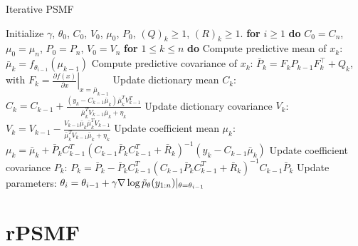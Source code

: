 \documentclass{mldsmsc}
\begin{document}
\begin{algorithm}[H]
\caption{Iterative PSMF}
\begin{algorithmic}[1]
\State Initialize $\gamma$, $\theta_0$, $C_0$, $V_0$, $\mu_0$, $P_0$, $(Q)_k{\geq1}$, $(R)_k{\geq1}$.
\State \textbf{for} $i \geq 1$ \textbf{do}
\State \hspace{1em} $C_0 = C_n$, $\mu_0 = \mu_n$, $P_0 = P_n$, $V_0 = V_n$
\State \hspace{1em} \textbf{for} $1 \leq k \leq n$ \textbf{do}
\State \hspace{2em} Compute predictive mean of $x_k$:
\State \hspace{3em} $\bar{\mu}_k = f_{\theta_{i-1}}(\mu_{k-1})$
\State \hspace{2em} Compute predictive covariance of $x_k$:
\State \hspace{3em} $\bar{P}_k = F_k P_{k-1} F_k^\top + Q_k$, with $F_k = \left. \frac{\partial f(x)}{\partial x} \right|_{x=\bar{\mu}_{k-1}}$
\State \hspace{2em} Update dictionary mean $C_k$:
\State \hspace{3em} $C_k = C_{k-1} + \frac{(y_k - C_{k-1} \bar{\mu}_k) \bar{\mu}_k^T V_{k-1}^T}{\bar{\mu}_k^T V_{k-1} \bar{\mu}_k + \eta_k}$
\State \hspace{2em} Update dictionary covariance $V_k$:
\State \hspace{3em} $V_k = V_{k-1} - \frac{V_{k-1} \bar{\mu}_k \bar{\mu}_k^T V_{k-1}}{\bar{\mu}_k^T V_{k-1} \bar{\mu}_k + \eta_k}$
\State \hspace{2em} Update coefficient mean $\mu_k$:
\State \hspace{3em} $\mu_k = \bar{\mu}_k + \bar{P}_k C_{k-1}^T (C_{k-1} \bar{P}_k C_{k-1}^T + \bar{R}_k)^{-1} (y_k - C_{k-1} \bar{\mu}_k)$
\State \hspace{2em} Update coefficient covariance $P_k$:
\State \hspace{3em} $P_k = \bar{P}_k - \bar{P}_k C_{k-1}^T (C_{k-1} \bar{P}_k C_{k-1}^T + \bar{R}_k)^{-1} C_{k-1} \bar{P}_k$
\State \hspace{1em} Update parameters:
\State \hspace{2em} $\theta_i = \theta_{i-1} + \gamma \nabla \log \Tilde{p}_{\theta}(y_{1:n}) \vert_{\theta = \theta_{i-1}}$
\end{algorithmic}\label{algo:1}
\end{algorithm}

\section{rPSMF}
\end{document}
